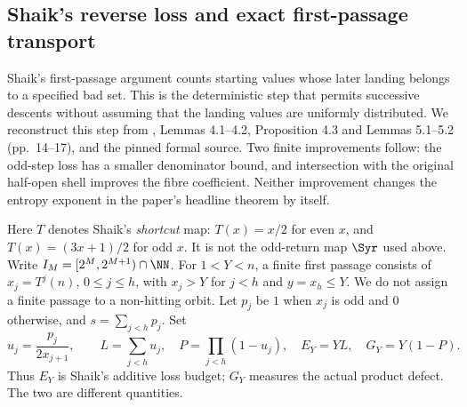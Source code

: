 \subsection{Shaik's reverse loss and exact first-passage transport}
\label{sec:Shaik-reverse}
Shaik's first-passage argument counts starting values whose later landing
belongs to a specified bad set. This is the deterministic step that permits
successive descents without assuming that the landing values are uniformly
distributed. We reconstruct this step from \cite{Shaik2026v324},
Lemmas 4.1--4.2, Proposition 4.3 and Lemmas 5.1--5.2
(pp.~14--17), and the pinned formal source. Two finite improvements follow:
the odd-step loss has a smaller denominator bound, and intersection with
the original half-open shell improves the fibre coefficient.
Neither improvement changes the entropy exponent in the paper's
headline theorem by itself.

Here \(T\) denotes Shaik's \emph{shortcut} map:
\(T(x)=x/2\) for even \(x\), and \(T(x)=(3x+1)/2\) for odd \(x\).
It is not the odd-return map \(\Syr\) used above.
Write \(I_M=[2^M,2^{M+1})\cap\NN\).
For \(1<Y<n\), a finite first passage consists of
\(x_j=T^j(n)\), \(0\le j\le h\), with \(x_j>Y\) for \(j<h\)
and \(y=x_h\le Y\). We do not assign a finite passage to a non-hitting
orbit. Let \(p_j\) be \(1\) when \(x_j\) is odd and \(0\) otherwise,
and \(s=\sum_{j<h}p_j\). Set
\[
 u_j=\frac{p_j}{2x_{j+1}},\qquad
 L=\sum_{j<h}u_j,\quad P=\prod_{j<h}(1-u_j),\quad
 E_Y=YL,\quad G_Y=Y(1-P).
\]
Thus \(E_Y\) is Shaik's additive loss budget; \(G_Y\) measures the
actual product defect. The two are different quantities.

